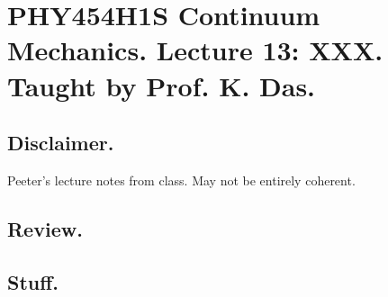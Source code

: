 
%

\chapter{PHY454H1S Continuum Mechanics.  Lecture 13: XXX.  Taught by Prof. K. Das.}
\label{chap:continuumL13}
{}
\date{Mar 2, 2012}

\beginArtWithToc

\section{Disclaimer.}

Peeter's lecture notes from class.  May not be entirely coherent.

\section{Review.}

\section{Stuff.}


\EndArticle
